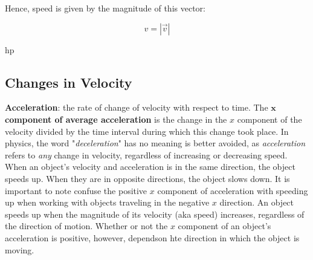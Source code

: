         Hence, speed is given by the magnitude of this vector:

        \[
            v = |\overrightarrow{v}|
        \]

hp

    \subsection{Changes in Velocity}
        \textbf{Acceleration}: the rate of change of velocity with respect to time. The $\bm{x}$ \textbf{component of average acceleration} is the change in the $x$ component of the velocity divided by the time interval
        during which this change took place. In physics, the word "\textit{deceleration}" has no meaning is better avoided, as \textit{acceleration} refers to \textit{any} change in velocity, regardless of increasing
        or decreasing speed. \\

        When an object's velocity and acceleration is in the same direction, the object speeds up. When they are in opposite directions, the object slows down. It is important to note confuse the positive $x$ component
        of acceleration with speeding up when working with objects traveling in the negative $x$ direction. An object speeds up when the magnitude of its velocity (aka speed) increases, regardless of the direction of
        motion. Whether or not the $x$ component of an object's acceleration is positive, however, dependson hte direction in which the object is moving. \\

